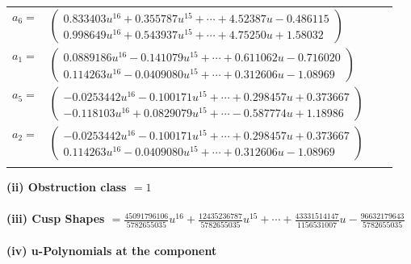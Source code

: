 \documentclass[1p]{elsarticle_modified}
\theoremstyle{definition}
\begin{document}
\begin{tabular}{m{7pt} m{180pt} m{7pt} m{180pt} }
\flushright $a_{6}=$&$\begin{pmatrix}0.833403 u^{16}+0.355787 u^{15}+\cdots+4.52387 u-0.486115\\0.998649 u^{16}+0.543937 u^{15}+\cdots+4.75250 u+1.58032\end{pmatrix}$ \\
\flushright $a_{1}=$&$\begin{pmatrix}0.0889186 u^{16}-0.141079 u^{15}+\cdots+0.611062 u-0.716020\\0.114263 u^{16}-0.0409080 u^{15}+\cdots+0.312606 u-1.08969\end{pmatrix}$ \\
\flushright $a_{5}=$&$\begin{pmatrix}-0.0253442 u^{16}-0.100171 u^{15}+\cdots+0.298457 u+0.373667\\-0.118103 u^{16}+0.0829079 u^{15}+\cdots-0.587774 u+1.18986\end{pmatrix}$ \\
\flushright $a_{2}=$&$\begin{pmatrix}-0.0253442 u^{16}-0.100171 u^{15}+\cdots+0.298457 u+0.373667\\0.114263 u^{16}-0.0409080 u^{15}+\cdots+0.312606 u-1.08969\end{pmatrix}$\\&\end{tabular}
\flushleft \textbf{(ii) Obstruction class $= 1$}\\~\\
\flushleft \textbf{(iii) Cusp Shapes $= \frac{45091796106}{5782655035} u^{16}+\frac{12435236787}{5782655035} u^{15}+\cdots+\frac{43331514147}{1156531007} u-\frac{96632179643}{5782655035}$}\\~\\
\newpage\renewcommand{\arraystretch}{1}
\flushleft \textbf{(iv) u-Polynomials at the component}\newline \\
\end{document}
